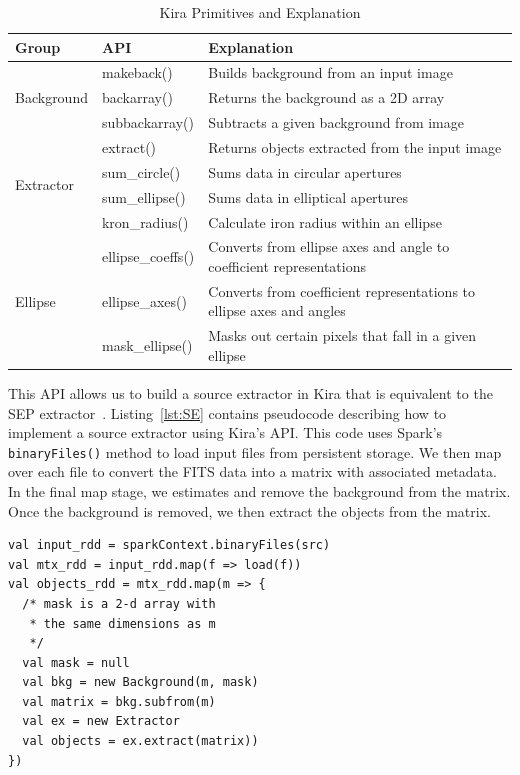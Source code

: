 \documentclass[10pt,journal,compsoc]{IEEEtran}
\begin{document}
\begin{table}[t]
\begin{center}
\caption{Kira Primitives and Explanation}
\label{tb:Primitives}
\begin{tabular}{ |l|l|l| }
\hline
Group & API & Explanation \\ \hline \hline
\multirow{3}{*}{Background} & makeback() & Builds background from an input image \\
 & backarray() & Returns the background as a 2D array \\
 & subbackarray() & Subtracts a given background from image \\ \hline
\multirow{4}{*}{Extractor} & extract() & Returns objects extracted from the input image \\
 & sum\_circle() & Sums data in circular apertures \\
 & sum\_ellipse() & Sums data in elliptical apertures \\ 
 & kron\_radius() & Calculate iron radius within an ellipse \\ \hline
\multirow{3}{*}{Ellipse} & ellipse\_coeffs() & Converts from ellipse axes and angle to coefficient representations \\
 & ellipse\_axes() & Converts from coefficient representations to ellipse axes and angles \\ 
 & mask\_ellipse() & Masks out certain pixels that fall in a given ellipse \\ \hline
\end{tabular}
\end{center}
\end{table}

This API allows us to build a source extractor in Kira that is equivalent to the SEP
extractor~\cite{barbary2015}.
Listing~\ref{lst:SE} contains pseudocode describing how to implement a source extractor
using Kira's API. This code uses Spark's \texttt{binaryFiles()} method to load input
files from persistent storage. We then map over each file to convert the FITS data into
a matrix with associated metadata. In the final map stage, we estimates and remove the
background from the matrix. Once the background is removed, we then extract the objects
from the matrix.

\begin{lstlisting}[caption=Objects Extraction Logic, label=lst:SE, linewidth=0.5\textwidth, xleftmargin=2.5ex]
val input_rdd = sparkContext.binaryFiles(src)
val mtx_rdd = input_rdd.map(f => load(f))
val objects_rdd = mtx_rdd.map(m => {
  /* mask is a 2-d array with 
   * the same dimensions as m
   */
  val mask = null
  val bkg = new Background(m, mask)
  val matrix = bkg.subfrom(m)
  val ex = new Extractor
  val objects = ex.extract(matrix))
})
\end{lstlisting}
\end{document}
